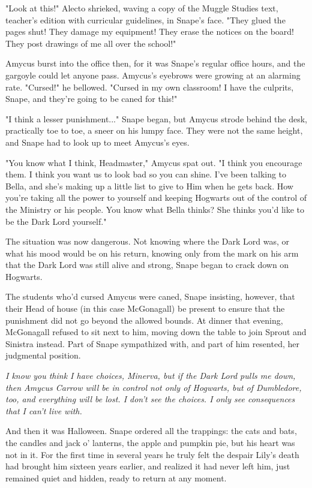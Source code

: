 \documentclass[a4paper,11pt]{article}
\begin{document}
"Look at this!" Alecto shrieked, waving a copy of the Muggle Studies text, teacher's edition with curricular guidelines, in Snape's face. "They glued the pages shut! They damage my equipment! They erase the notices on the board! They post drawings of me all over the school!"

Amycus burst into the office then, for it was Snape's regular office hours, and the gargoyle could let anyone pass. Amycus's eyebrows were growing at an alarming rate. "Cursed!" he bellowed. "Cursed in my own classroom! I have the culprits, Snape, and they're going to be caned for this!"

"I think a lesser punishment..." Snape began, but Amycus strode behind the desk, practically toe to toe, a sneer on his lumpy face. They were not the same height, and Snape had to look up to meet Amycus's eyes.

"You know what I think, Headmaster," Amycus spat out. "I think you encourage them. I think you want us to look bad so you can shine. I've been talking to Bella, and she's making up a little list to give to Him when he gets back. How you're taking all the power to yourself and keeping Hogwarts out of the control of the Ministry or his people. You know what Bella thinks? She thinks you'd like to be the Dark Lord yourself."

The situation was now dangerous. Not knowing where the Dark Lord was, or what his mood would be on his return, knowing only from the mark on his arm that the Dark Lord was still alive and strong, Snape began to crack down on Hogwarts.

The students who'd cursed Amycus were caned, Snape insisting, however, that their Head of house (in this case McGonagall) be present to ensure that the punishment did not go beyond the allowed bounds. At dinner that evening, McGonagall refused to sit next to him, moving down the table to join Sprout and Sinistra instead. Part of Snape sympathized with, and part of him resented, her judgmental position.

\emph{I know you think I have choices, Minerva, but if the Dark Lord pulls me down, then Amycus Carrow will be in control not only of Hogwarts, but of Dumbledore, too, and everything will be lost. I don't see the choices. I only see consequences that I can't live with.}

And then it was Halloween. Snape ordered all the trappings: the cats and bats, the candles and jack o' lanterns, the apple and pumpkin pie, but his heart was not in it. For the first time in several years he truly felt the despair Lily's death had brought him sixteen years earlier, and realized it had never left him, just remained quiet and hidden, ready to return at any moment.
\end{document}
